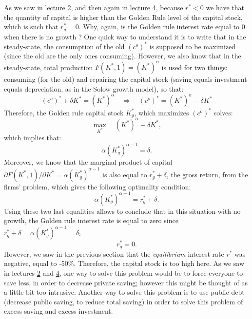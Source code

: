 \documentclass[]{book}
\theoremstyle{definition}
\theoremstyle{definition}
\theoremstyle{definition}
\theoremstyle{remark}
\begin{document}
As we saw in \href{lecture2.html}{lecture 2}, and then again in
\href{lecture4.html}{lecture 4}, because \(r^{*}<0\) we have that the
quantity of capital is higher than the Golden Rule level of the capital
stock, which is such that \(r^{*}_g=0\). Why, again, is the Golden rule
interest rate equal to 0 when there is no growth ? One quick way to
understand it is to write that in the steady-state, the consumption of
the old \((c^{o})^{*}\) is supposed to be maximized (since the old are
the only ones consuming). However, we also know that in the
steady-state, total production \(F(K^{*}, 1) = (K^{*})^{\alpha}\) is
used for two things: consuming (for the old) and repairing the capital
stock (saving equals investment equals depreciation, as in the Solow
growth model), so that:
\[(c^{o})^{*} + \delta K^{*} = (K^{*})^{\alpha} \quad \Rightarrow \quad (c^{o})^{*} = (K^{*})^{\alpha} -\delta K^{*} \]
Therefore, the Golden rule capital stock \(K^{*}_g\), which maximizes
\((c^{o})^{*}\) solves:
\[\max_{K^{*}}\quad (K^{*})^{\alpha}-\delta K^{*},\] which implies that:
\[\alpha (K^{*}_g)^{\alpha-1}=\delta.\] Moreover, we know that the
marginal product of capital
\(\partial F(K^{*}, 1)/\partial K^{*} = \alpha (K^{*}_g)^{\alpha-1}\) is
also equal to \(r^{*}_g+\delta\), the gross return, from the firms'
problem, which gives the following optimality condition:
\[\alpha (K^{*}_g)^{\alpha-1}=r^{*}_g+\delta.\] Using these two last
equalities allows to conclude that in this situation with no growth, the
Golden rule interest rate is equal to zero since
\(r^{*}_g+\delta = \alpha (K^{*}_g)^{\alpha-1} =\delta\): \[r^{*}_g=0.\]
However, we saw in the previous section that the \emph{equilibrium}
interest rate \(r^{*}\) was negative, equal to -50\%. Therefore, the
capital stock is too high here. As we saw in lectures
\href{lecture2.html}{2} and \href{lecture4.html}{4}, one way to solve
this problem would be to force everyone to save less, in order to
decrease private saving; however this might be thought of as a little
bit too intrusive. Another way to solve this problem is to use public
debt (decrease public saving, to reduce total saving) in order to solve
this problem of excess saving and excess investment.
\end{document}
